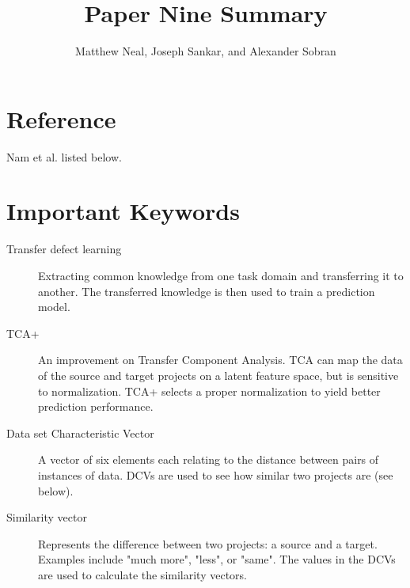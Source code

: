 \documentclass[english]{article}
\begin{document}
\title{Paper Nine Summary}


\author{Matthew Neal, Joseph Sankar, and Alexander Sobran}

\maketitle

\section*{Reference}

Nam et al. \cite{Nam} listed below.


\section*{Important Keywords}
\begin{description}
\item[{Transfer defect learning}] Extracting common knowledge from one task domain and transferring it to another. The transferred knowledge is then used to train a prediction model.
\item[{TCA+}] An improvement on Transfer Component Analysis. TCA can map the data of the source and target projects on a latent feature space, but is sensitive to normalization. TCA+ selects a proper normalization to yield better prediction performance.
\item[{Data set Characteristic Vector}] A vector of six elements each relating to the distance between pairs of instances of data. DCVs are used to see how similar two projects are (see below).
\item[{Similarity vector}] Represents the difference between two projects: a source and a target. Examples include "much more", "less", or "same". The values in the DCVs are used to calculate the similarity vectors.
\end{description}
\end{document}
